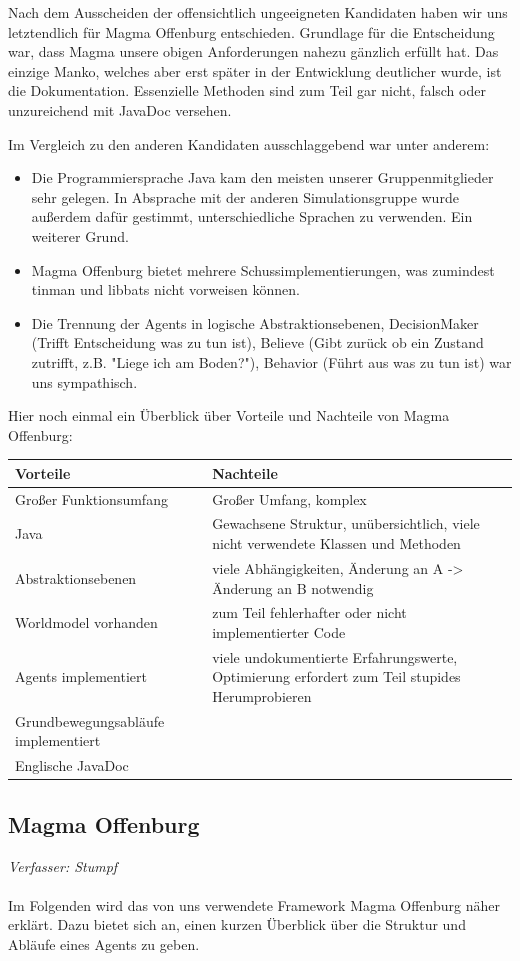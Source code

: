 \documentclass[fontsize=12pt,a4paper,final]{scrartcl}[2003/01/01]
\begin{document}
Nach dem Ausscheiden der offensichtlich ungeeigneten Kandidaten haben wir uns letztendlich für Magma Offenburg entschieden. Grundlage für die Entscheidung war, dass Magma unsere obigen Anforderungen nahezu gänzlich erfüllt hat. Das einzige Manko, welches aber erst später in der Entwicklung deutlicher wurde, ist die Dokumentation. Essenzielle Methoden sind zum Teil gar nicht, falsch oder unzureichend mit JavaDoc versehen.

Im Vergleich zu den anderen Kandidaten ausschlaggebend war unter anderem:
\begin{itemize}
\item Die Programmiersprache Java kam den meisten unserer Gruppenmitglieder sehr gelegen. In Absprache mit der anderen Simulationsgruppe wurde au{\ss}erdem dafür gestimmt, unterschiedliche Sprachen zu verwenden. Ein weiterer Grund.
\item Magma Offenburg bietet mehrere Schussimplementierungen, was zumindest tinman und libbats nicht vorweisen können.
\item Die Trennung der Agents in logische Abstraktionsebenen, DecisionMaker (Trifft Entscheidung was zu tun ist), Believe (Gibt zurück ob ein Zustand zutrifft, z.B. "Liege ich am Boden?"), Behavior (Führt aus was zu tun ist) war uns sympathisch.
\end{itemize}

Hier noch einmal ein Überblick über Vorteile und Nachteile von Magma Offenburg:
\begin{tabularx}{\textwidth}{|X|X|}
\hline
 \textbf{Vorteile}&\textbf{Nachteile}\\
\hline
\hline
 Großer Funktionsumfang&Großer Umfang, komplex\\
\hline 
 Java&Gewachsene Struktur, unübersichtlich, viele nicht verwendete Klassen und Methoden\\
\hline
 Abstraktionsebenen&viele Abhängigkeiten, Änderung an A -> Änderung an B notwendig\\
\hline
 Worldmodel vorhanden&zum Teil fehlerhafter oder nicht implementierter Code\\
\hline
 Agents implementiert&viele undokumentierte Erfahrungswerte,  Optimierung erfordert zum Teil stupides Herumprobieren\\
\hline
 Grundbewegungsabläufe implementiert&\\
\hline
 Englische JavaDoc&\\
\hline
\end{tabularx}

\subsection{Magma Offenburg}
\textit{Verfasser: Stumpf}\\
\\
Im Folgenden wird das von uns verwendete Framework Magma Offenburg näher erklärt. Dazu bietet sich an, einen kurzen Überblick über die Struktur und Abläufe eines Agents zu geben.
\end{document}
